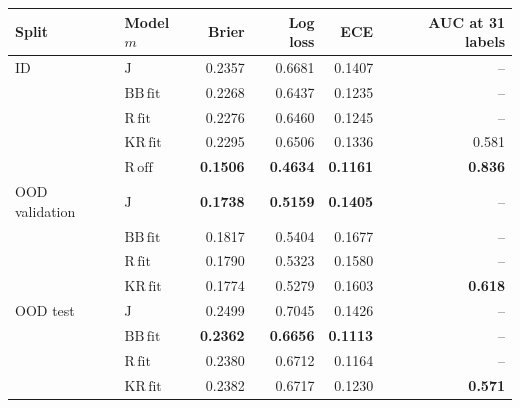 \begin{tabular}{llrrrr}
\toprule
Split & Model $m$ & Brier & Log loss & ECE & AUC at 31 labels \\
\midrule
ID & $\mathrm{J}$ & 0.2357 & 0.6681 & 0.1407 & -- \\
 & $\mathrm{BB\,fit}$ & 0.2268 & 0.6437 & 0.1235 & -- \\
 & $\mathrm{R\,fit}$ & 0.2276 & 0.6460 & 0.1245 & -- \\
 & $\mathrm{KR\,fit}$ & 0.2295 & 0.6506 & 0.1336 & 0.581 \\
 & $\mathrm{R\,off}$ & \textbf{0.1506} & \textbf{0.4634} & \textbf{0.1161} & \textbf{0.836} \\
\midrule
OOD validation & $\mathrm{J}$ & \textbf{0.1738} & \textbf{0.5159} & \textbf{0.1405} & -- \\
 & $\mathrm{BB\,fit}$ & 0.1817 & 0.5404 & 0.1677 & -- \\
 & $\mathrm{R\,fit}$ & 0.1790 & 0.5323 & 0.1580 & -- \\
 & $\mathrm{KR\,fit}$ & 0.1774 & 0.5279 & 0.1603 & \textbf{0.618} \\
\midrule
OOD test & $\mathrm{J}$ & 0.2499 & 0.7045 & 0.1426 & -- \\
 & $\mathrm{BB\,fit}$ & \textbf{0.2362} & \textbf{0.6656} & \textbf{0.1113} & -- \\
 & $\mathrm{R\,fit}$ & 0.2380 & 0.6712 & 0.1164 & -- \\
 & $\mathrm{KR\,fit}$ & 0.2382 & 0.6717 & 0.1230 & \textbf{0.571} \\
\bottomrule
\end{tabular}
